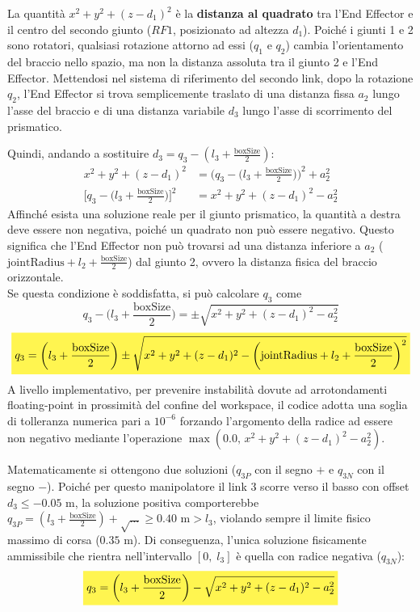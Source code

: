 ﻿\documentclass[11pt, a4paper]{article}
\begin{document}
La quantità $x^2 + y^2 + (z - d_1)^2$ è la \textbf{distanza al quadrato} tra l'End Effector e il centro del secondo giunto ($RF1$, posizionato ad altezza $d_1$). Poiché i giunti 1 e 2 sono rotatori, qualsiasi rotazione attorno ad essi ($q_1$ e $q_2$) cambia l'orientamento del braccio nello spazio, ma non la distanza assoluta tra il giunto 2 e l'End Effector. Mettendosi nel sistema di riferimento del secondo link, dopo la rotazione $q_2$, l'End Effector si trova semplicemente traslato di una distanza fissa $a_2$ lungo l'asse del braccio e di una distanza variabile $d_3$ lungo l'asse di scorrimento del prismatico.

Quindi, andando a sostituire $d_3 = q_3 - (l_3 + \frac{\text{boxSize}}{2})$:
\begin{align*}
    x^2 + y^2 + (z - d_1)^2 &= \biggl(q_3 - \biggl(l_3 + \frac{\text{boxSize}}{2}\biggr) \biggr)^{2} + a_{2}^{2}\\
    \biggl[q_3 - \biggl(l_3 + \frac{\text{boxSize}}{2}\biggr) \biggr]^{2} &= x^2 + y^2 + (z - d_1)^2 - a_{2}^{2}
\end{align*}
Affinché esista una soluzione reale per il giunto prismatico, la quantità a destra deve essere non negativa, poiché un quadrato non può essere negativo. Questo significa che l'End Effector non può trovarsi ad una distanza inferiore a $a_2$ ($\text{jointRadius} + l_{2} + \frac{\text{boxSize}}{2}$) dal giunto 2, ovvero la distanza fisica del braccio orizzontale.\\
Se questa condizione è soddisfatta, si può calcolare $q_3$ come
\[
    q_3 - \biggl(l_3 + \frac{\text{boxSize}}{2}\biggr) = \pm \sqrt{x^2 + y^2 + (z - d_1)^2 - a_{2}^{2}}
\]
\[
    \colorbox{customYellow}{$\displaystyle
        q_3 = \biggl(l_3 + \frac{\text{boxSize}}{2}\biggr) \pm \sqrt{x^2 + y^2 + (z - d_1)^2 - \biggl( \text{jointRadius} + l_{2} + \frac{\text{boxSize}}{2} \biggr)^{2}}
    $}
\]
A livello implementativo, per prevenire instabilità dovute ad arrotondamenti floating-point in prossimità del confine del workspace, il codice adotta una soglia di tolleranza numerica pari a $10^{-6}$ forzando l'argomento della radice ad essere non negativo mediante l'operazione $\max(0.0, \, x^2 + y^2 + (z - d_1)^2 - a_2^2)$.

Matematicamente si ottengono due soluzioni ($q_{3P}$ con il segno $+$ e $q_{3N}$ con il segno $-$). Poiché per questo manipolatore il link 3 scorre verso il basso con offset $d_3 \le -0.05\text{ m}$, la soluzione positiva comporterebbe $q_{3P} = (l_3 + \frac{\text{boxSize}}{2}) + \sqrt{\dots} \ge 0.40\text{ m} > l_3$, violando sempre il limite fisico massimo di corsa ($0.35\text{ m}$). Di conseguenza, l'unica soluzione fisicamente ammissibile che rientra nell'intervallo $[0, \; l_3]$ è quella con radice negativa ($q_{3N}$):
\[
    \colorbox{customYellow}{$\displaystyle
        q_3 = \biggl(l_3 + \frac{\text{boxSize}}{2}\biggr) - \sqrt{x^2 + y^2 + (z - d_1)^2 - a_{2}^{2}}
    $}
\]
\end{document}
